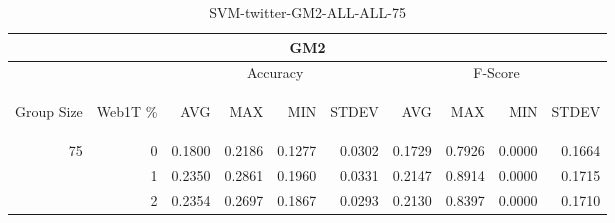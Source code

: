 \begin{center}
\begin{table}[htbp] 
 \begin{center}
\begin{tabular}{ | r | r | r | r | r | r | r | r | r | r |}
\hline
\multicolumn{10}{|c|}{GM2}\\
\hline
 & & \multicolumn{4}{|c|}{Accuracy} & \multicolumn{4}{|c|}{F-Score}\\ \cline{3-10}
\begin{sideways}Group Size\end{sideways} & \begin{sideways}Web1T \%\end{sideways} & \begin{sideways}AVG\end{sideways} & \begin{sideways}MAX\end{sideways} & \begin{sideways}MIN\end{sideways} & \begin{sideways}STDEV\end{sideways} & \begin{sideways}AVG\end{sideways} & \begin{sideways}MAX\end{sideways} & \begin{sideways}MIN\end{sideways} & \begin{sideways}STDEV\end{sideways}\\
\hline
\multirow{2}{*}{75}
 & 0 & 0.1800 & 0.2186 & 0.1277 & 0.0302 & 0.1729 & 0.7926 & 0.0000 & 0.1664\\ \cline{2-10}
 & 1 & 0.2350 & 0.2861 & 0.1960 & 0.0331 & 0.2147 & 0.8914 & 0.0000 & 0.1715\\ \cline{2-10}
 & 2 & 0.2354 & 0.2697 & 0.1867 & 0.0293 & 0.2130 & 0.8397 & 0.0000 & 0.1710\\ \cline{2-10}
\hline
\end{tabular}
\caption{SVM-twitter-GM2-ALL-ALL-75}
\label{table:SVM-twitter-GM2-ALL-ALL-75}
\end{center}
 \end{table}
\end{center}

